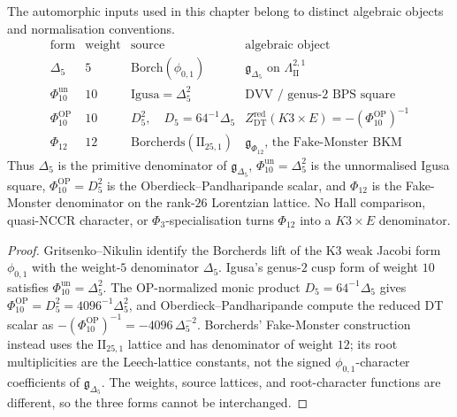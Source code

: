 \begin{proposition}
\label{prop:k3e-delta5-phi10-phi12-separation}
The automorphic inputs used in this chapter belong to distinct
algebraic objects and normalisation conventions.
\[
\begin{array}{c|c|c|c}
\text{form} & \text{weight} & \text{source} & \text{algebraic object} \\
\hline
\Delta_5 & 5 &
\mathrm{Borch}(\phi_{0,1}) &
\mathfrak g_{\Delta_5}\text{ on }\Lambda^{2,1}_{\mathrm{II}} \\
\Phi_{10}^{\mathrm{un}} & 10 &
\mathrm{Igusa}=\Delta_5^2 &
\text{DVV / genus-2 BPS square} \\
\Phi_{10}^{\mathrm{OP}} & 10 &
D_5^2,\quad D_5=64^{-1}\Delta_5 &
Z^{\mathrm{red}}_{\mathrm{DT}}(K3\times E)=-(\Phi_{10}^{\mathrm{OP}})^{-1} \\
\Phi_{12} & 12 &
\mathrm{Borcherds}(\mathrm{II}_{25,1}) &
\mathfrak g_{\Phi_{12}}\text{, the Fake-Monster BKM}
\end{array}
\]
Thus \(\Delta_5\) is the primitive denominator of
\(\mathfrak g_{\Delta_5}\), \(\Phi_{10}^{\mathrm{un}}=\Delta_5^2\) is
the unnormalised Igusa square, \(\Phi_{10}^{\mathrm{OP}}=D_5^2\) is the
Oberdieck--Pandharipande scalar, and \(\Phi_{12}\) is the Fake-Monster
denominator on the rank-\(26\) Lorentzian lattice. No Hall comparison,
quasi-NCCR character, or \(\Phi_3\)-specialisation turns \(\Phi_{12}\)
into a \(K3\times E\) denominator.
\end{proposition}

\begin{proof}
Gritsenko--Nikulin identify the Borcherds lift of the K3 weak Jacobi
form \(\phi_{0,1}\) with the weight-\(5\) denominator \(\Delta_5\).
Igusa's genus-\(2\) cusp form of weight \(10\) satisfies
\(\Phi_{10}^{\mathrm{un}}=\Delta_5^2\). The OP-normalized monic product
\(D_5=64^{-1}\Delta_5\) gives
\(\Phi_{10}^{\mathrm{OP}}=D_5^2=4096^{-1}\Delta_5^2\), and
Oberdieck--Pandharipande compute the reduced DT scalar as
\(-(\Phi_{10}^{\mathrm{OP}})^{-1}=-4096\,\Delta_5^{-2}\). Borcherds'
Fake-Monster construction instead uses
the \(\mathrm{II}_{25,1}\) lattice and has denominator of weight \(12\);
its root multiplicities are the Leech-lattice constants, not the
signed \(\phi_{0,1}\)-character coefficients of \(\mathfrak g_{\Delta_5}\). The weights,
source lattices, and root-character functions are different, so the
three forms cannot be interchanged.
\end{proof}

